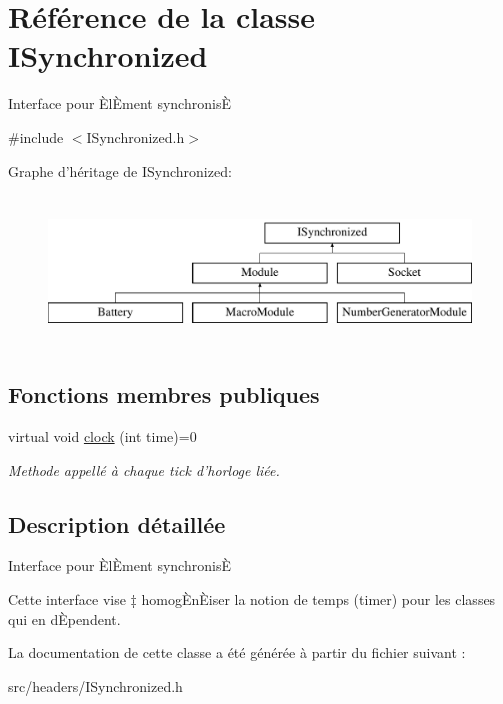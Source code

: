 \hypertarget{classISynchronized}{\section{Référence de la classe I\-Synchronized}
\label{classISynchronized}
}


Interface pour ÈlÈment synchronisÈ  




{\ttfamily \#include $<$I\-Synchronized.\-h$>$}

Graphe d'héritage de I\-Synchronized\-:\begin{figure}[H]
\begin{center}
\leavevmode
\includegraphics[height=4.000000cm]{classISynchronized}
\end{center}
\end{figure}
\subsection*{Fonctions membres publiques}
\begin{DoxyCompactItemize}
\item 
\hypertarget{classISynchronized_af7155c662758d6c70f381bb9b11afcd6}{virtual void \hyperlink{classISynchronized_af7155c662758d6c70f381bb9b11afcd6}{clock} (int time)=0}\label{classISynchronized_af7155c662758d6c70f381bb9b11afcd6}

\begin{DoxyCompactList}\small\item\em Methode appellé à chaque tick d'horloge liée. \end{DoxyCompactList}\end{DoxyCompactItemize}


\subsection{Description détaillée}
Interface pour ÈlÈment synchronisÈ 

Cette interface vise ‡ homogÈnÈiser la notion de temps (timer) pour les classes qui en dÈpendent. 

La documentation de cette classe a été générée à partir du fichier suivant \-:\begin{DoxyCompactItemize}
\item 
src/headers/I\-Synchronized.\-h\end{DoxyCompactItemize}
